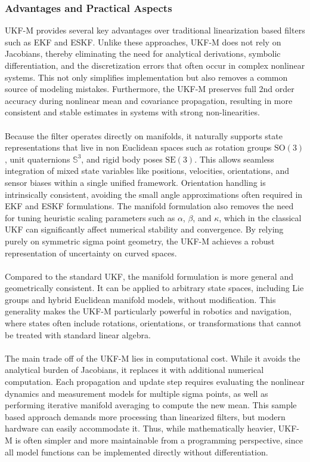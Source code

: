 \subsubsection{Advantages and Practical Aspects}
UKF-M provides several key advantages over traditional linearization based filters such as EKF and ESKF. Unlike these approaches, UKF-M does not rely on Jacobians, thereby eliminating the need for analytical derivations, symbolic differentiation, and the discretization errors that often occur in complex nonlinear systems. This not only simplifies implementation but also removes a common source of modeling mistakes. Furthermore, the UKF-M preserves full 2nd order accuracy during nonlinear mean and covariance propagation, resulting in more consistent and stable estimates in systems with strong non-linearities.  
\\ \\
Because the filter operates directly on manifolds, it naturally supports state representations that live in non Euclidean spaces such as rotation groups $\mathrm{SO}(3)$, unit quaternions $\mathbb{S}^3$, and rigid body poses $\mathrm{SE}(3)$. This allows seamless integration of mixed state variables like positions, velocities, orientations, and sensor biases within a single unified framework. Orientation handling is intrinsically consistent, avoiding the small angle approximations often required in EKF and ESKF formulations. The manifold formulation also removes the need for tuning heuristic scaling parameters such as $\alpha$, $\beta$, and $\kappa$, which in the classical UKF can significantly affect numerical stability and convergence. By relying purely on symmetric sigma point geometry, the UKF-M achieves a robust representation of uncertainty on curved spaces.  
\\ \\
Compared to the standard UKF, the manifold formulation is more general and geometrically consistent. It can be applied to arbitrary state spaces, including Lie groups and hybrid Euclidean manifold models, without modification. This generality makes the UKF-M particularly powerful in robotics and navigation, where states often include rotations, orientations, or transformations that cannot be treated with standard linear algebra.  
\\ \\
The main trade off of the UKF-M lies in computational cost. While it avoids the analytical burden of Jacobians, it replaces it with additional numerical computation. Each propagation and update step requires evaluating the nonlinear dynamics and measurement models for multiple sigma points, as well as performing iterative manifold averaging to compute the new mean. This sample based approach demands more processing than linearized filters, but modern hardware can easily accommodate it. Thus, while mathematically heavier, UKF-M is often simpler and more maintainable from a programming perspective, since all model functions can be implemented directly without differentiation.  
